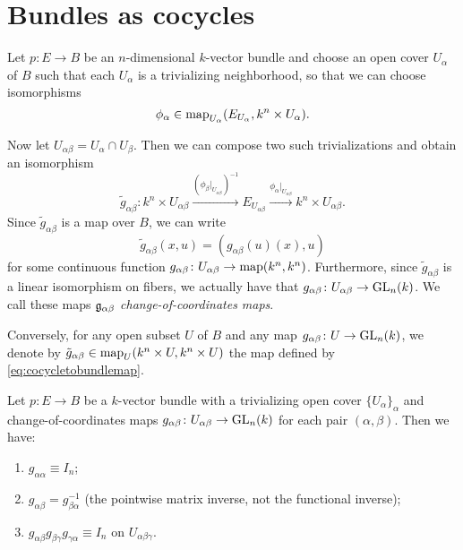 \documentclass[a4paper,openany]{scrbook}
\begin{document}
\section{Bundles as cocycles}
\label{sec:bundlesascocycles}
Let $p\colon E \to B$ be an $n$-dimensional $k$-vector bundle and choose an open cover $U_\alpha$ of $B$ such that each $U_\alpha$ is a trivializing neighborhood, so that we can choose isomorphisms
\[
\phi_\alpha \in \operatorname{map}_{U_\alpha}(E_{U_\alpha},k^n \times U_{\alpha}).
\]


Now let $U_{\alpha\beta} = U_\alpha \cap U_\beta$. Then we can compose two such trivializations and obtain an isomorphism
\[
\tilde g_{\alpha\beta}\colon k^{n} \times U_{\alpha\beta} \xrightarrow{(\phi_\beta|_{U_{\alpha\beta}})^{-1}} E_{U_{\alpha\beta}} \xrightarrow{\phi_\alpha|_{U_{\alpha\beta}}} k^{n} \times U_{\alpha\beta}.
\]
Since $\tilde g_{\alpha\beta}$ is a map over $B$, we can write
\begin{equation}\label{eq:cocycletobundlemap}
\tilde g_{\alpha\beta}(x,u) = (g_{\alpha\beta}(u)(x),u)
\end{equation}
for some continuous function $g_{\alpha\beta}\colon U_{\alpha\beta} \to \operatorname{map}(k^{n},k^{n})$. Furthermore, since $\tilde g_{\alpha\beta}$ is a linear isomorphism on fibers, we actually have that $g_{\alpha\beta}\colon U_{\alpha\beta} \to \operatorname{GL}_{n}(k)$. We call these maps $\mathfrak g_{\alpha\beta}$ \emph{change-of-coordinates maps}.

Conversely, for any open subset $U$ of $B$ and any map $g_{\alpha\beta}\colon U \to \operatorname{GL}_n(k)$, we denote by $\tilde g_{\alpha\beta}\in \operatorname{map}_{U}(k^n \times U,k^n \times U)$ the map defined by \eqref{eq:cocycletobundlemap}.

\begin{lemma} \label{lemma:vectorbundlegivescocycle}
Let $p\colon E \to B$ be a $k$-vector bundle with a trivializing open cover $\{U_\alpha\}_\alpha$ and change-of-coordinates maps $g_{\alpha\beta}\colon U_{\alpha\beta} \to \operatorname{GL}_{n}(k)$ for each pair $(\alpha,\beta)$. Then we have:
\begin{enumerate}[label=\normalfont \bfseries{(COC\arabic*)},leftmargin=*]
\item $g_{\alpha\alpha} \equiv I_n$; \label{it:coc1}
\item $g_{\alpha\beta} = g_{\beta\alpha}^{-1}$ (the pointwise matrix inverse, not the functional inverse); \label{it:coc2}
\item $g_{\alpha\beta} g_{\beta\gamma} g_{\gamma\alpha} \equiv I_n$ on $U_{\alpha\beta\gamma}$. \label{it:coc3}
\end{enumerate}
\end{lemma}
\end{document}
